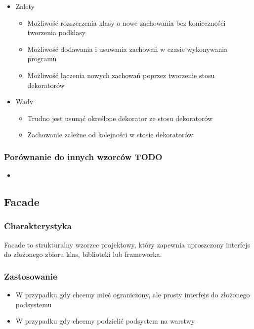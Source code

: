 \documentclass[a4paper,15pt]{article}
\begin{document}
\begin{itemize}
\item Zalety
\begin{itemize}
\item Możliwość rozszerzenia klasy o nowe zachowania bez konieczności tworzenia podklasy
\item Możliwość dodawania i usuwania zachowań w czasie wykonywania programu
\item Możliwość łączenia nowych zachowań poprzez tworzenie stosu dekoratorów
\end{itemize}
\item Wady
\begin{itemize}
\item Trudno jest usunąć określone dekorator ze stosu dekoratorów
\item Zachowanie zależne od kolejności w stosie dekoratorów
\end{itemize}
\end{itemize}


\subsubsection{Porównanie do innych wzorców TODO}
\begin{itemize}
\item
\end{itemize}


\newpage
\subsection{Facade}

\subsubsection{Charakterystyka}
Facade to strukturalny wzorzec projektowy, który zapewnia uproszczony interfejs do złożonego zbioru klas, biblioteki lub frameworka. 

\subsubsection{Zastosowanie}
\begin{itemize}
\item W przypadku gdy chcemy mieć ograniczony, ale prosty interfejs do złożonego podsystemu
\item W przypadku gdy chcemy podzielić podsystem na warstwy
\end{itemize}
\end{document}

